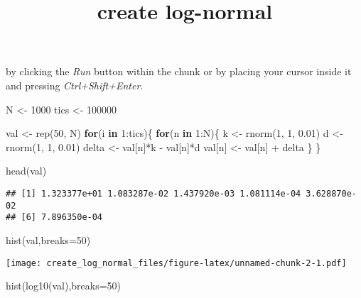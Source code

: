 \documentclass[
]{article}
\title{create log-normal}
\author{}
\date{\vspace{-2.5em}}
\newenvironment{Shaded}{\begin{snugshade}}{\end{snugshade}}
\newcommand{\AttributeTok}[1]{\textcolor[rgb]{0.77,0.63,0.00}{#1}}
\newcommand{\ControlFlowTok}[1]{\textcolor[rgb]{0.13,0.29,0.53}{\textbf{#1}}}
\newcommand{\DecValTok}[1]{\textcolor[rgb]{0.00,0.00,0.81}{#1}}
\newcommand{\FloatTok}[1]{\textcolor[rgb]{0.00,0.00,0.81}{#1}}
\newcommand{\FunctionTok}[1]{\textcolor[rgb]{0.00,0.00,0.00}{#1}}
\newcommand{\NormalTok}[1]{#1}
\newcommand{\OtherTok}[1]{\textcolor[rgb]{0.56,0.35,0.01}{#1}}
\newcommand{\SpecialCharTok}[1]{\textcolor[rgb]{0.00,0.00,0.00}{#1}}
\begin{document}
\maketitle

by clicking the \emph{Run} button within the chunk or by placing your
cursor inside it and pressing \emph{Ctrl+Shift+Enter}.

\begin{Shaded}
\begin{Highlighting}[]
\NormalTok{N }\OtherTok{\textless{}{-}} \DecValTok{1000}
\NormalTok{tics }\OtherTok{\textless{}{-}} \DecValTok{100000}

\NormalTok{val }\OtherTok{\textless{}{-}} \FunctionTok{rep}\NormalTok{(}\DecValTok{50}\NormalTok{, N)}
\ControlFlowTok{for}\NormalTok{(i }\ControlFlowTok{in} \DecValTok{1}\SpecialCharTok{:}\NormalTok{tics)\{}
  \ControlFlowTok{for}\NormalTok{(n }\ControlFlowTok{in} \DecValTok{1}\SpecialCharTok{:}\NormalTok{N)\{}
\NormalTok{    k }\OtherTok{\textless{}{-}} \FunctionTok{rnorm}\NormalTok{(}\DecValTok{1}\NormalTok{, }\DecValTok{1}\NormalTok{, }\FloatTok{0.01}\NormalTok{)}
\NormalTok{    d }\OtherTok{\textless{}{-}} \FunctionTok{rnorm}\NormalTok{(}\DecValTok{1}\NormalTok{, }\DecValTok{1}\NormalTok{, }\FloatTok{0.01}\NormalTok{)}
\NormalTok{    delta }\OtherTok{\textless{}{-}}\NormalTok{ val[n]}\SpecialCharTok{*}\NormalTok{k }\SpecialCharTok{{-}}\NormalTok{ val[n]}\SpecialCharTok{*}\NormalTok{d}
\NormalTok{    val[n] }\OtherTok{\textless{}{-}}\NormalTok{ val[n] }\SpecialCharTok{+}\NormalTok{ delta}
\NormalTok{  \}}
\NormalTok{\}}

\FunctionTok{head}\NormalTok{(val)}
\end{Highlighting}
\end{Shaded}

\begin{verbatim}
## [1] 1.323377e+01 1.083287e-02 1.437920e-03 1.081114e-04 3.628870e-02
## [6] 7.896350e-04
\end{verbatim}

\begin{Shaded}
\begin{Highlighting}[]
\FunctionTok{hist}\NormalTok{(val,}\AttributeTok{breaks=}\DecValTok{50}\NormalTok{)}
\end{Highlighting}
\end{Shaded}

\texttt{[image: create\_log\_normal\_files/figure-latex/unnamed-chunk-2-1.pdf]}

\begin{Shaded}
\begin{Highlighting}[]
\FunctionTok{hist}\NormalTok{(}\FunctionTok{log10}\NormalTok{(val),}\AttributeTok{breaks=}\DecValTok{50}\NormalTok{)}
\end{Highlighting}
\end{Shaded}
\end{document}
